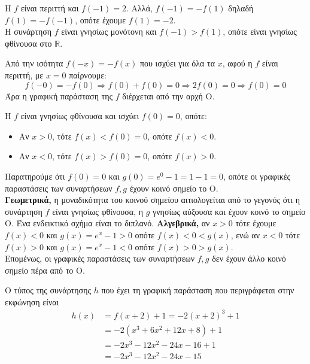 \begin{alist}
\item Η $f$ είναι περιττή και $f(-1) = 2$. Αλλά, $f(-1) = -f(1)$ δηλαδή $f(1) = -f(-1)$, οπότε έχουμε $f(1) = -2$. \\
Η συνάρτηση $f$ είναι γνησίως μονότονη και $f(-1) > f(1)$, οπότε είναι γνησίως φθίνουσα στο $\mathbb{R}$.
\item Από την ισότητα $f(-x) = -f(x)$ που ισχύει για όλα τα $x$, αφού η $f$ είναι περιττή, με $x=0$ παίρνουμε:
\[f(-0) = -f(0) \Rightarrow f(0) + f(0) = 0 \Rightarrow 2f(0) = 0 \Rightarrow f(0) = 0\]
Άρα η γραφική παράσταση της $f$ διέρχεται από την αρχή $\text{O}$.
\item Η $f$ είναι γνησίως φθίνουσα και ισχύει $f(0) = 0$, οπότε:
\begin{itemize}
\item Αν $x > 0$, τότε $f(x) < f(0) = 0$, οπότε $f(x) < 0$.
\item Αν $x < 0$, τότε $f(x) > f(0) = 0$, οπότε $f(x) > 0$.
\end{itemize}
Παρατηρούμε ότι $f(0) = 0$ και $g(0) = e^0 - 1 = 1 - 1 = 0$, οπότε οι γραφικές παραστάσεις των συναρτήσεων $f, g$ έχουν κοινό σημείο το $\text{O}$. \\
\textbf{Γεωμετρικά,} η μοναδικότητα του κοινού σημείου αιτιολογείται από το γεγονός ότι η συνάρτηση $f$ είναι γνησίως φθίνουσα, η $g$ γνησίως αύξουσα και έχουν κοινό το σημείο $\text{O}$. Ένα ενδεικτικό σχήμα είναι το διπλανό.
\textbf{Αλγεβρικά,} αν $x > 0$ τότε έχουμε $f(x) < 0$ και $g(x) = e^x - 1 > 0$ οπότε $f(x) < 0 < g(x)$, ενώ αν $x < 0$ τότε $f(x) > 0$ και $g(x) = e^x - 1 < 0$ οπότε $f(x) > 0 > g(x)$. \\
Επομένως, οι γραφικές παραστάσεις των συναρτήσεων $f, g$ δεν έχουν άλλο κοινό σημείο πέρα από το $\text{O}$.
\begin{center}
\end{center}
\item Ο τύπος της συνάρτησης $h$ που έχει τη γραφική παράσταση που περιγράφεται στην εκφώνηση είναι
\begin{align*}
h(x) &= f(x+2) + 1 = -2(x+2)^3 + 1 \\
&= -2(x^3 + 6x^2 + 12x + 8) + 1 \\
&= -2x^3 - 12x^2 - 24x - 16 + 1 \\
&= -2x^3 - 12x^2 - 24x - 15
\end{align*}
\end{alist}

